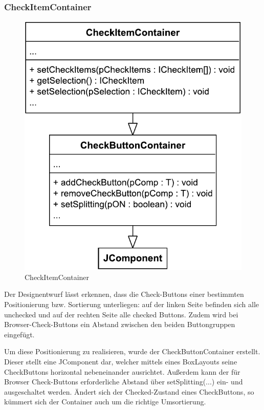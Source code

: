 \vspace{-5px}

\subsubsection{CheckItemContainer}

\begin{figure}
	\vspace{-12px}
	\centering
	\includegraphics[width=.95\linewidth]{../graphic/diagrams/CD_CheckItemContainer/CD_CheckItemContainer}
	\caption{CheckItemContainer}
	\label{fig:cdcheckitemcontainer}
\end{figure}

Der Designentwurf lässt erkennen, dass die Check-Buttons einer bestimmten Positionierung bzw. Sortierung unterliegen: auf der linken Seite befinden sich alle unchecked und auf der rechten Seite alle checked Buttons. Zudem wird bei Browser-Check-Buttons ein Abstand zwischen den beiden Buttongruppen eingefügt. 

Um diese Positionierung zu realisieren, wurde der CheckButtonContainer erstellt. Dieser stellt eine JComponent dar, welcher mittels eines BoxLayouts seine CheckButtons horizontal nebeneinander ausrichtet. Außerdem kann der für Browser Check-Buttons erforderliche Abstand über setSplitting(...) ein- und ausgeschaltet werden. Ändert sich der Checked-Zustand eines CheckButtons, so kümmert sich der Container auch um die richtige Umsortierung.

